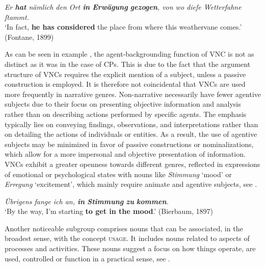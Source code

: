 \documentclass[output=paper,colorlinks,citecolor=brown]{langscibook}
\begin{document}
\ea%
\label{ex:fleissner:14}
{\itshape Er \textbf{hat} nämlich den Ort \textbf{in} \textbf{Erwägung} \textbf{gezogen}, von wo dieſe Wetterfahne ſtammt.}\\
\glt ‘In fact, \textbf{he has considered} the place from where this weathervane comes.'\\ \hfill (Fontane, 1899)
\z 

As can be seen in example , the agent-backgrounding function of VNC is not as distinct as it was in the case of CPs. This is due to the fact that the argument structure of VNCs requires the explicit mention of a subject, unless a passive construction is employed. It is therefore not coincidental that VNCs are used more frequently in narrative genres. Non-narrative  necessarily have fewer agentive subjects due to their focus on presenting objective information and analysis rather than on describing actions performed by specific agents. The emphasis typically lies on conveying findings, observations, and interpretations rather than on detailing the actions of individuals or entities. As a result, the use of agentive subjects may be minimized in favor of passive constructions or nominalizations, which allow for a more impersonal and objective presentation of information. VNCs exhibit a greater openness towards different genres, reflected in expressions of emotional or psychological states with nouns like \textit{Stimmung} ‘mood' or \textit{Erregung} ‘excitement', which mainly require animate and agentive subjects, see .

\ea%
\label{ex:fleissner:15}
{\itshape Übrigens fange ich an, \textbf{in}  \textbf{Stimmung} \textbf{zu}  \textbf{kommen}.}\\
\glt ‘By the way, I'm starting\textbf{ to get in the mood}.' \hfill (Bierbaum, 1897)
\z 

Another noticeable subgroup comprises nouns that can be associated, in the broadest sense, with the concept \textsc{usage}. It includes nouns related to aspects of processes and activities. These nouns suggest a focus on how things operate, are used, controlled or function in a practical sense, see .
\end{document}
